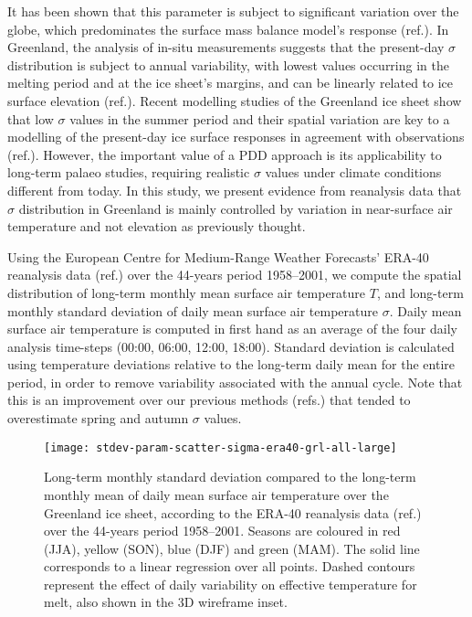 \documentclass[review]{igs}
\begin{document}
It has been shown that this parameter is subject to significant variation over the globe, which predominates the surface mass balance model’s response (ref.). In Greenland, the analysis of in-situ measurements suggests that the present-day $\sigma$ distribution is subject to annual variability, with lowest values occurring in the melting period and at the ice sheet's margins, and can be linearly related to ice surface elevation (ref.). Recent modelling studies of the Greenland ice sheet show that low $\sigma$ values in the summer period and their spatial variation are key to a modelling of the present-day ice surface responses in agreement with observations (ref.). However, the important value of a PDD approach is its applicability to long-term palaeo studies, requiring realistic $\sigma$ values under climate conditions different from today. In this study, we present evidence from reanalysis data that $\sigma$ distribution in Greenland is mainly controlled by variation in near-surface air temperature and not elevation as previously thought.

Using the European Centre for Medium-Range Weather Forecasts’ ERA-40 reanalysis data (ref.) over the 44-years period 1958–2001, we compute the spatial distribution of long-term monthly mean surface air temperature $T$, and long-term monthly standard deviation of daily mean surface air temperature $\sigma$. Daily mean surface air temperature is computed in first hand as an average of the four daily analysis time-steps (00:00, 06:00, 12:00, 18:00). Standard deviation is calculated using temperature deviations relative to the long-term daily mean for the entire period, in order to remove variability associated with the annual cycle. Note that this is an improvement over our previous methods (refs.) that tended to overestimate spring and autumn $\sigma$ values.

\begin{figure*}
    \centering\texttt{[image: stdev-param-scatter-sigma-era40-grl-all-large]}
    \caption{Long-term monthly standard deviation compared to the long-term monthly mean of daily mean surface air temperature over the Greenland ice sheet, according to the ERA-40 reanalysis data (ref.) over the 44-years period 1958–2001. Seasons are coloured in red (JJA), yellow (SON), blue (DJF) and green (MAM). The solid line corresponds to a linear regression over all points. Dashed contours represent the effect of daily variability on effective temperature for melt, also shown in the 3D wireframe inset.}
    \label{fig:grl}
\end{figure*}
\end{document}
